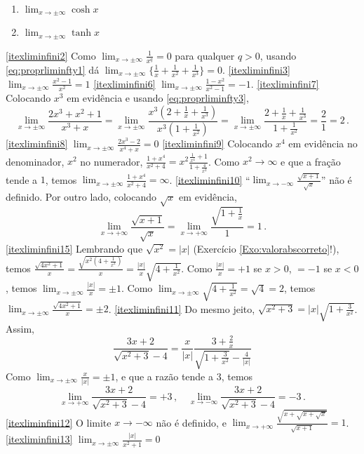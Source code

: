 \begin{exo}
\begin{multicols}{3}
\begin{enumerate}
\item\label{itexliminfini21} $\lim_{x\to \pm\infty}\cosh x$
\item\label{itexliminfini22} $\lim_{x\to \pm\infty}\tanh x$
\end{enumerate}
\end{multicols}
\vspace{0.01cm}
\begin{sol}
\eqref{itexliminfini2} Como $\lim_{x\to\pm\infty}\frac{1}{x^q}=0$ para
qualquer $q>0$, usando \eqref{eq:proprliminfty1} dá 
$\lim_{x\to
\pm\infty}\{\frac{1}{x}+\frac{1}{x^2}+\frac{1}{x^3}\}=0$.
\eqref{itexliminfini3} $\lim_{x\to \pm\infty}\frac{x^2-1}{x^2}=1$
\eqref{itexliminfini6} $\lim_{x\to\pm\infty}\frac{1-x^2}{x^2-1}=-1$.
\eqref{itexliminfini7} Colocando $x^3$ em evidência e usando
\eqref{eq:proprliminfty3}, 
$$\lim_{x\to\pm\infty}\frac{2x^3+x^2+1}{x^3+x}=\lim_{x\to
\pm\infty}\frac{x^3(2+\frac{1}{x}+\frac{1}{x^3})}{x^3(1+\frac{1}{x^2})
} =\lim_{x\to
\pm\infty}\frac{2+\frac{1}{x}+\frac{1}{x^3}}{1+\frac{1}{x^2}}=\frac{2}
{1}=2\,.$$
\eqref{itexliminfini8} $\lim_{x\to
\pm\infty}\frac{2x^3-2}{x^4+x}=0$
\eqref{itexliminfini9} Colocando $x^4$ em
evidência no denominador, $x^2$ no numerador,
$\frac{1+x^4}{x^2+4}=x^2\frac{\frac{1}{x^4}+1}{1+\frac{4}{x^2}}$.
Como $x^2\to\infty$ e que a fração tende a $1$, temos 
$\lim_{x\to\pm\infty}\frac{1+x^4}{x^2+4}=\infty$.
\eqref{itexliminfini10} ``$\lim_{x\to
-\infty}\frac{\sqrt{x+1}}{\sqrt{x}}$'' não é definido.
Por outro lado, colocando $\sqrt{x}$ em evidência, 
$$\lim_{x\to+\infty}\frac{\sqrt{x+1}}{\sqrt{x}}=
\lim_{x\to +\infty}\frac{\sqrt{1+\frac{1}{{x}}}}{1}=1\,.
$$
\eqref{itexliminfini15}
Lembrando que $\sqrt{x^2}=|x|$ (Exercício
\ref{Exo:valorabscorreto}!), temos
$\frac{\sqrt{4x^2+1}}{x}=\frac{\sqrt{x^2(4+\frac{1}{x^2})}}{x}=\frac{
|x|}{x}\sqrt{4+\frac{1}{x^2}}$.
Como $\frac{|x|}{x}=+1$ se $x>0$, $=-1$ se $x<0$, temos $\lim_{x\to\pm\infty}\frac{|x|}{x}=\pm 1$. Como 
$\lim_{x\to\pm\infty}\sqrt{4+\frac{1}{x^2}}=\sqrt{4}=2$, temos
$\lim_{x\to\pm\infty}\frac{\sqrt{4x^2+1}}{x}=\pm 2$.
\eqref{itexliminfini11} 
Do mesmo jeito,
$\sqrt{x^2+3}=|x|\sqrt{1+\frac{3}{x^2}}$. Assim,
$$
\frac{3x+2}{\sqrt{x^2+3}-4}=\frac{x}{|x|}\frac{3+\frac{2}{x}}{\sqrt{1+
\frac{3}{x^2}}-\frac{4}{|x|}}
$$
Como $\lim_{x\to\pm\infty}\frac{x}{|x|}=\pm 1$, e que a razão tende a
$3$, temos 
$$\lim_{x\to+\infty}\frac{3x+2}{\sqrt{x^2+3}-4}=+3\,,\quad 
\lim_{x\to-\infty}\frac{3x+2}{\sqrt{x^2+3}-4}=-3\,.
$$
\eqref{itexliminfini12} O limite $x\to-\infty$
não é definido, e $\lim_{x\to+\infty}
\frac{\sqrt{x+\sqrt{x+\sqrt{x}}}}{\sqrt{x+1}}=1$.
\eqref{itexliminfini13} $\lim_{x\to\pm\infty}\frac{|x|}{x^2+1}=0$

\end{sol}
\end{exo}
